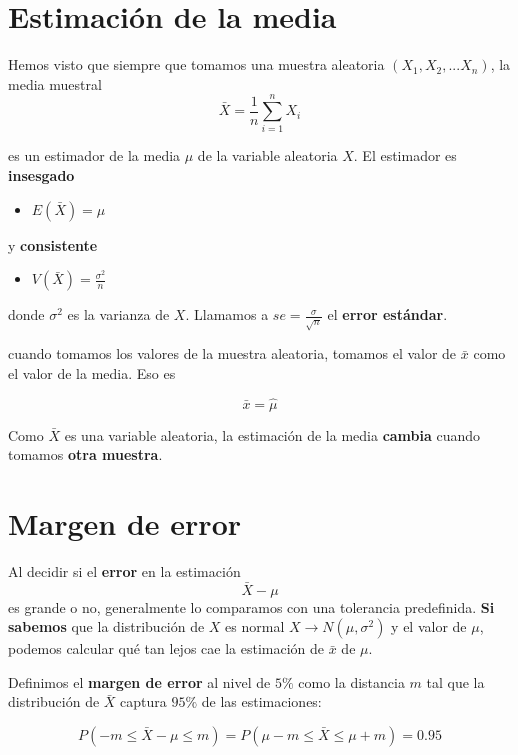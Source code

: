 \documentclass[
]{book}
\providecommand{\tightlist}{%
  \setlength{\itemsep}{0pt}\setlength{\parskip}{0pt}}
\begin{document}
\hypertarget{estimaciuxf3n-de-la-media}{%
\section{Estimación de la media}\label{estimaciuxf3n-de-la-media}}

Hemos visto que siempre que tomamos una muestra aleatoria \((X_1, X_2, ... X_n)\), la media muestral
\[\bar{X}=\frac{1}{n}\sum_{i=1}^n X_i\]

es un estimador de la media \(\mu\) de la variable aleatoria \(X\). El estimador es \textbf{insesgado}

\begin{itemize}
\tightlist
\item
  \(E(\bar{X})=\mu\)
\end{itemize}

y \textbf{consistente}

\begin{itemize}
\tightlist
\item
  \(V(\bar{X})=\frac{\sigma^2}{n}\)
\end{itemize}

donde \(\sigma^2\) es la varianza de \(X\). Llamamos a \(se=\frac{\sigma}{\sqrt{n}}\) el \textbf{error estándar}.

cuando tomamos los valores de la muestra aleatoria, tomamos el valor de \(\bar{x}\) como el valor de la media. Eso es

\[\bar{x}=\hat{\mu}\]

Como \(\bar{X}\) es una variable aleatoria, la estimación de la media \textbf{cambia} cuando tomamos \textbf{otra muestra}.

\hypertarget{margen-de-error-1}{%
\section{Margen de error}\label{margen-de-error-1}}

Al decidir si el \textbf{error} en la estimación \[\bar{X}-\mu\] es grande o no, generalmente lo comparamos con una tolerancia predefinida. \textbf{Si sabemos} que la distribución de \(X\) es normal \(X \rightarrow N(\mu, \sigma^2)\) y el valor de \(\mu\), podemos calcular qué tan lejos cae la estimación de \(\bar{x}\) de \(\mu\).

Definimos el \textbf{margen de error} al nivel de \(5\%\) como la distancia \(m\) tal que la distribución de \(\bar{X}\) captura \(95\%\) de las estimaciones:

\[P(-m \leq \bar{X}-\mu \leq m)=P(\mu-m \leq \bar{X} \leq\mu + m)=0.95\]
\end{document}
